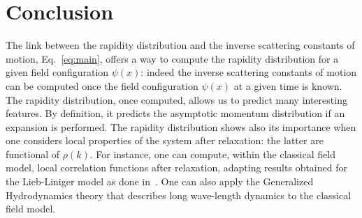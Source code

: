 \documentclass[submission,Phys,10pt]{SciPost}%
\newcommand{\comIsa}[1]{{\color{red}#1}}
\begin{document}


\section{Conclusion}

The link %
between the rapidity distribution and the inverse scattering constants of motion, Eq.~\eqref{eq:main}, offers a  way to 
compute the rapidity distribution for a given field configuration $\psi(x)$: indeed the inverse scattering constants of motion can be computed once the field configuration $\psi(x)$ at a given time is known. %
The rapidity distribution, once computed, \comIsa{allows us} to predict many interesting features. By definition, it predicts the asymptotic momentum distribution if an expansion is performed. 
The rapidity distribution shows also  its importance when one considers local properties of the system after relaxation: the latter are 
functional of $\rho(k)$. 
For instance, one can compute, within the classical field model, local correlation functions after relaxation, adapting results obtained for the Lieb-Liniger model as done in~\cite{del_vecchio_del_vecchio_exact_2020}.
One can also apply the Generalized Hydrodynamics theory that describes long wave-length dynamics to the classical field model. 


\end{document}
